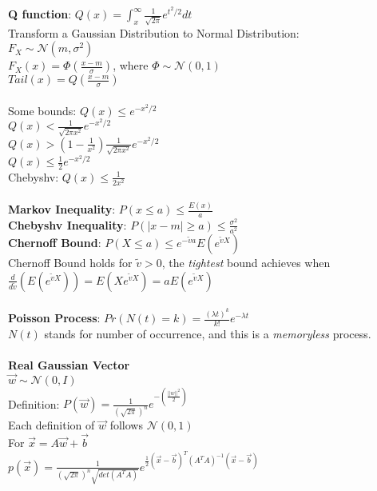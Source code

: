 \documentclass [12pt] {article}
\begin{document}
\begin{spacing}{1.5}
\begin{multicols}{2}
\noindent
\textbf{Q function}: $ Q(x) = \int_x^\infty \frac{1}{\sqrt{2\pi}}e^{t^2/2}dt$\\
Transform a Gaussian Distribution to Normal Distribution:\\
$F_X \sim \mathcal{N}(m,\sigma^2)$\\
$F_X(x) = \Phi (\frac{x-m}{\sigma})$, where $\Phi \sim \mathcal{N}(0,1)$\\
$Tail(x) = Q(\frac{x-m}{\sigma})$\\
~\\
Some bounds: $Q(x) \leq e^{-x^2/2}$\\
$Q(x) < \frac{1}{\sqrt{2\pi x^2}} e^{-x^2/2}$\\
$Q(x) > (1-\frac{1}{x^2})\frac{1}{\sqrt{2\pi x^2}} e^{-x^2/2}$\\
$Q(x)\leq\frac{1}{2}e^{-x^2/2}$\\
Chebyshv: $Q(x)\leq\frac{1}{2x^2}$\\
~\\
\textbf{Markov Inequality}: $P(x\leq a)\leq \frac{E(x)}{a}$\\
\textbf{Chebyshv Inequality}: $P(|x-m|\geq a) \leq \frac{\sigma^2}{a^2}$\\
\textbf{Chernoff Bound}: $P(X\leq a) \leq e^{-\widetilde{v}a}E(e^{\widetilde{v}X})$\\
Chernoff Bound holds for $\widetilde{v} > 0$, the \emph{tightest} bound achieves when\\
$\frac{d}{d\widetilde{v}}(E(e^{\widetilde{v}X})) = E(Xe^{\widetilde{v}X}) = a E(e^{\widetilde{v}X})$\\
~\\
\textbf{Poisson Process}: $Pr(N(t) = k) = \frac{(\lambda t)^k}{k !} e^{-\lambda t}$\\
$N(t)$ stands for number of occurrence, and this is a \emph{memoryless} process. \\
~\\
\textbf{Real Gaussian Vector} \\ $\vec{w} \sim \mathcal{N}(0, I)$\\
Definition: $P(\vec{w}) = \frac{1}{(\sqrt{2\pi})^n} e^{-(\frac{||w||^2}{2})}$\\
Each definition of $\vec{w}$ follows $\mathcal{N}(0,1)$\\
For $\vec{x} = A\vec{w} + \vec{b}$ \\
$p(\vec{x}) = \frac{1}{(\sqrt{2\pi})^n\sqrt{det(A^T A)}}e^{\frac{1}{2}(\vec{x}-\vec{b})^{T}(A^T A)^{-1}(\vec{x}-\vec{b})}$\\

\end{multicols}
\end{spacing}
\end{document}
